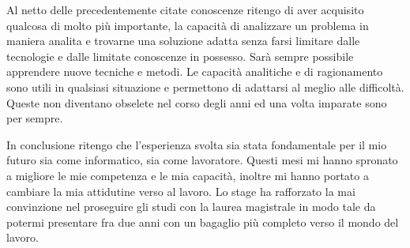 Al netto delle precedentemente citate conoscenze ritengo di aver acquisito qualcosa di molto più importante, la capacità di analizzare un problema in maniera analita e trovarne una soluzione adatta senza farsi limitare dalle tecnologie e dalle limitate conoscenze in possesso. Sarà sempre possibile apprendere nuove tecniche e metodi. Le capacità analitiche e di ragionamento sono utili in qualsiasi situazione e permettono di adattarsi al meglio alle difficoltà. Queste non diventano obselete nel corso degli anni ed una volta imparate sono per sempre.

In conclusione ritengo che l'esperienza svolta sia stata fondamentale per il mio futuro sia come informatico, sia come lavoratore. Questi mesi mi hanno spronato a migliore le mie competenza e le mia capacità, inoltre mi hanno portato a cambiare la mia attidutine verso al lavoro. Lo stage ha rafforzato la mai convinzione nel proseguire gli studi con la laurea magistrale in modo tale da potermi presentare fra due anni con un bagaglio più completo verso il mondo del lavoro.